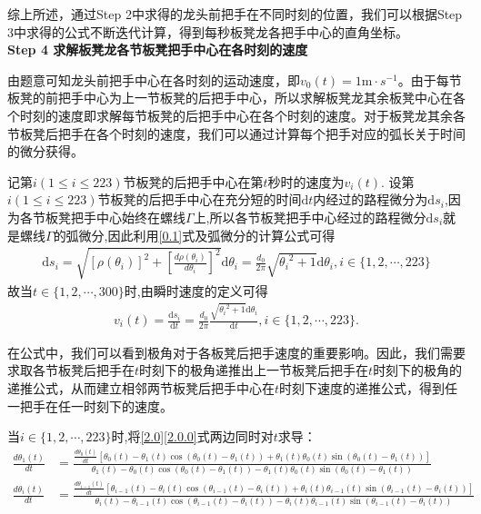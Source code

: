 \documentclass[../main.tex]{subfiles}
\begin{document}
      \par 综上所述，通过Step 2中求得的龙头前把手在不同时刻的位置，我们可以根据Step 3中求得的公式不断迭代计算，得到每秒板凳龙各把手中心的直角坐标。
   \\\textbf{Step 4 求解板凳龙各节板凳把手中心在各时刻的速度}
  \par 由题意可知龙头前把手中心在各时刻的运动速度，即\(v_0(t) = 1\mathrm{m}\cdot s^{-1}\)。由于每节板凳的前把手中心为上一节板凳的后把手中心，所以求解板凳龙其余板凳中心在各个时刻的速度即求解每节板凳的后把手中心在各个时刻的速度。对于板凳龙其余各节板凳后把手在各个时刻的速度，我们可以通过计算每个把手对应的弧长关于时间的微分获得。
  \par 记第\(i(1\leqslant i\leqslant 223)\)节板凳的后把手中心在第\(t\)秒时的速度为\(v_i(t)\).
  设第\(i(1\leqslant i\leqslant 223)\)节板凳的后把手中心在充分短的时间\(\mathrm{d}t\)内经过的路程微分为\(\mathrm{d}s_i\),因为各节板凳把手中心始终在螺线\(\varGamma\)上,所以各节板凳把手中心经过的路程微分\(\mathrm{d}s_i\)就是螺线\(\varGamma\)的弧微分,因此利用\eqref{0.1}式及弧微分的计算公式可得
  \begin{align}\label{1.........12}
  \mathrm{d}s_i=\sqrt{[\rho (\theta _i)]^2+[\frac{d\rho(\theta_i)}{d\theta_i}]^2}\mathrm{d}\theta  _i=\frac{d_0}{2\pi}\sqrt{{\theta _i}^2+1}\mathrm{d}\theta _i,i\in \{ 1,2,\cdots ,223 \}  
  \end{align}
  故当\(t\in \{ 1,2,\cdots ,300 \}\)时,由瞬时速度的定义可得
  \begin{align}
  v_i(t) =\frac{\mathrm{d}s_i}{\mathrm{d}t}=\frac{d_0}{2\pi}\frac{\sqrt{{\theta _i}^2 + 1}\mathrm{d}\theta _i}{\mathrm{d}t}, i\in \{1, 2, \cdots, 223\}. \label{3.1}
  \end{align}
  \par 在公式中，我们可以看到极角对于各板凳后把手速度的重要影响。因此，我们需要求取各节板凳后把手在$t$时刻下的极角递推出上一节板凳后把手在$t$时刻下的极角的递推公式，从而建立相邻两节板凳后把手中心在$t$时刻下速度的递推公式，得到任一把手在任一时刻下的速度。
  \par 当\(i\in \{ 1,2,\cdots ,223 \}\)时,将\eqref{2.0}\eqref{2.0.0}式两边同时对\(t\)求导：
  \begin{align}
    \frac{d\theta_1(t)}{dt} &= \frac{\frac{d\theta_0(t)}{dt} [\theta_0(t) - \theta_1(t) \cos(\theta_0(t) - \theta_1(t)) + \theta_1(t) \theta_0(t) \sin(\theta_0(t) - \theta_1(t))]}{\theta_1(t) - \theta_0(t) \cos(\theta_0(t) - \theta_1(t)) - \theta_1(t) \theta_0(t) \sin(\theta_0(t) - \theta_1(t))}  \label{3.123}\\
    \frac{d\theta_i(t)}{dt}& = \frac{\frac{d\theta_{i - 1}(t)}{dt} [\theta_{i - 1}(t) - \theta_i(t) \cos(\theta_{i - 1}(t) - \theta_i(t)) + \theta_i(t) \theta_{i - 1}(t) \sin(\theta_{i - 1}(t) - \theta_i(t))]}{\theta_i(t) - \theta_{i - 1}(t) \cos(\theta_{i - 1}(t) - \theta_i(t)) - \theta_i(t) \theta_{i - 1}(t) \sin(\theta_{i - 1}(t) - \theta_i(t))}\label{3.1456}
 \end{align}
\end{document}
